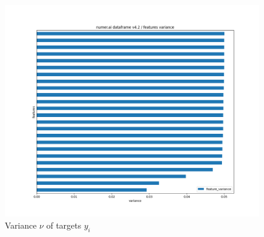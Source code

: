 \documentclass[12pt, a4paper]{article}
\begin{document}
\begin{figure}[htbp]
\begin{minipage}[t]{7cm}
\includegraphics[width=1\textwidth,trim={0 0 0 0},clip]{figures/targets_df_targets_variance_horizontal_barplot_2023-09-30.png}
\caption[Variance of Features]{Variance $\nu$ of targets $y_i$ }
\label{fig: targets_variance} 
\end{minipage}
\end{figure}
\newpage
\end{document}
